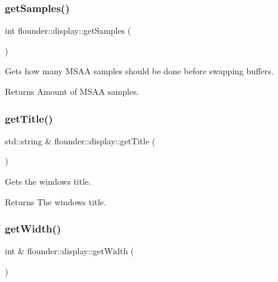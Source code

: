\subsubsection{\texorpdfstring{get\+Samples()}{getSamples()}}
{\footnotesize\ttfamily int flounder\+::display\+::get\+Samples (\begin{DoxyParamCaption}{ }\end{DoxyParamCaption})}



Gets how many M\+S\+AA samples should be done before swapping buffers. 

\begin{DoxyReturn}{Returns}
Amount of M\+S\+AA samples. 
\end{DoxyReturn}
\mbox{\label{classflounder_1_1display_ad5fc46c79d236783ac883878ec065f36}} 
\subsubsection{\texorpdfstring{get\+Title()}{getTitle()}}
{\footnotesize\ttfamily std\+::string \& flounder\+::display\+::get\+Title (\begin{DoxyParamCaption}{ }\end{DoxyParamCaption})}



Gets the window\textquotesingle{}s title. 

\begin{DoxyReturn}{Returns}
The window\textquotesingle{}s title. 
\end{DoxyReturn}
\mbox{\label{classflounder_1_1display_ac2b45bb8c8924b985895f2b08c03c3d9}} 
\subsubsection{\texorpdfstring{get\+Width()}{getWidth()}}
{\footnotesize\ttfamily int \& flounder\+::display\+::get\+Width (\begin{DoxyParamCaption}{ }\end{DoxyParamCaption})}



